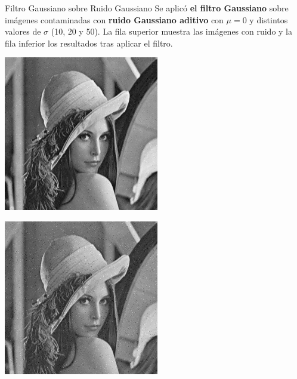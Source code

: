 \documentclass{beamer}
\begin{document}
\begin{frame}[fragile]{Filtro Gaussiano sobre Ruido Gaussiano}
	\justifying
	\footnotesize
	Se aplicó \textcolor{unahurverde}{\textbf{el filtro Gaussiano}} sobre imágenes contaminadas con \textcolor{unahurverde}{\textbf{ruido Gaussiano aditivo}}  
	con $\mu = 0$ y distintos valores de $\sigma$ (10, 20 y 50).  
	La fila superior muestra las imágenes con ruido y la fila inferior los resultados tras aplicar el filtro.
	
	\centering
	\begin{minipage}{0.25\linewidth}
		\centering
		\includegraphics[width=\linewidth]{../results/lena_gauss_sigma10}
	\end{minipage}\hfill
	\begin{minipage}{0.25\linewidth}
		\centering
		\includegraphics[width=\linewidth]{../results/lena_gauss_sigma20}

\end{minipage}
\end{frame}
\end{document}
